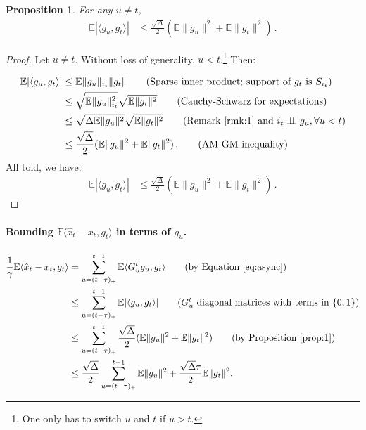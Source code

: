 \documentclass[twoside]{article}
\newcommand{\stepsize}{\gamma}
\newcommand{\overlap}{\tau}
\newcommand{\sparsity}{\Delta}
\newcommand{\E}{\mathbb{E}}
\newtheorem{proposition}{Proposition}
\begin{document}
\begin{proposition}\label{prop:1}
For any $u \neq t$,
\begin{align}\label{sparseproduct}
\E |\langle g_{u}, g_t \rangle | &\leq \frac{\sqrt{\sparsity}}{2}(\E\|g_{u}\|^2 + \E\|g_{t}\|^2)  \, .
\end{align}
\end{proposition}

\begin{proof}
Let $u \neq t$. Without loss of generality, $u < t$.\footnote{One only has to switch $u$ and $t$ if $u>t$.}
Then:

\begin{align}
\E |\langle g_{u}, g_t \rangle |
&\leq \E\|g_{u}\|_{i_t}\|g_t\| 
\tag*{(Sparse inner product; support of $g_t$ is $S_{i_t}$)} \nonumber \\ 
&\leq \sqrt{\E\|g_{u}\|_{i_t}^2}\sqrt{\E\|g_{t}\|^2}
\tag*{(Cauchy-Schwarz for expectations)} \nonumber \\ 
&\leq \sqrt{\sparsity \E\|g_{u}\|^2}\sqrt{\E\|g_{t}\|^2}
\tag*{(Remark~\ref{rmk:1} and $i_t \perp\!\!\!\perp g_u, \forall u < t$)} \nonumber \\ 
&\leq \frac{\sqrt{\sparsity}}{2}(\E\|g_{u}\|^2 + \E\|g_{t}\|^2)  \, .
\tag*{(AM-GM inequality)}
\end{align}
All told, we have:
\begin{align}
\E |\langle g_{u}, g_t \rangle | &\leq \frac{\sqrt{\sparsity}}{2}(\E\|g_{u}\|^2 + \E\|g_{t}\|^2)  \, .
\end{align}
\end{proof}

\paragraph{Bounding $\E\langle \hat x_t -x_t,  g_t\rangle$ in terms of $g_u$.}
\begin{align}
\frac{1}{\stepsize} \E\langle \hat x_t - x_t, g_t \rangle 
&= \sum_{u=(t - \overlap)_+}^{t-1} \E \langle G_u^t g_u, g_t \rangle
\tag*{(by Equation~\eqref{eq:async})} \nonumber \\
&\leq \sum_{u=(t - \overlap)_+}^{t-1} \E | \langle g_u, g_t \rangle |
\tag*{($G_u^t$ diagonal matrices with terms in $\{0, 1\}$)}\nonumber \\
&\leq \sum_{u=(t - \overlap)_+}^{t-1} \frac{\sqrt{\sparsity}}{2}(\E\|g_{u}\|^2 + \E\|g_{t}\|^2) 
\tag*{(by Proposition~\ref{prop:1})}\nonumber \\
&\leq \frac{\sqrt{\sparsity}}{2} \sum_{u=(t - \overlap)_+}^{t-1}\E\|g_{u}\|^2 + \frac{\sqrt{\sparsity}\overlap}{2}\E\|g_{t}\|^2 .
\end{align}
\end{document}
